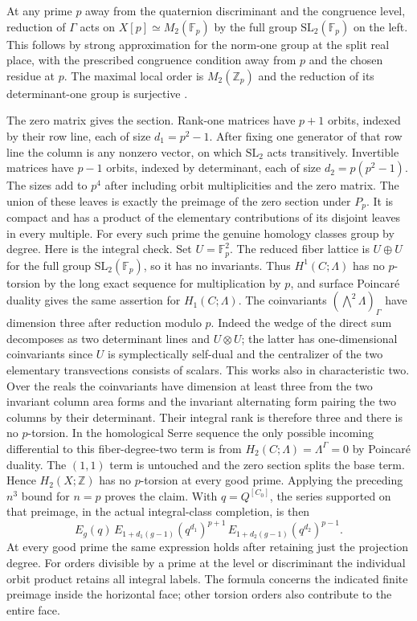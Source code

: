 At any prime \(p\) away from the quaternion discriminant and the congruence level, reduction of \(\Gamma\) acts on \(X[p]\simeq M_2(\mathbb F_p)\) by the full group \(\mathrm{SL}_2(\mathbb F_p)\) on the left. This follows by strong approximation for the norm-one group at the split real place, with the prescribed congruence condition away from \(p\) and the chosen residue at \(p\). The maximal local order is \(M_2(\mathbb Z_p)\) and the reduction of its determinant-one group is surjective \cite{voight}.

The zero matrix gives the section. Rank-one matrices have \(p+1\) orbits, indexed by their row line, each of size \(d_1=p^2-1\). After fixing one generator of that row line the column is any nonzero vector, on which \(\mathrm{SL}_2\) acts transitively. Invertible matrices have \(p-1\) orbits, indexed by determinant, each of size \(d_2=p(p^2-1)\). The sizes add to \(p^4\) after including orbit multiplicities and the zero matrix. The union of these leaves is exactly the preimage of the zero section under \(P_p\). It is compact and has a product of the elementary contributions of its disjoint leaves in every multiple. For every such prime the genuine homology classes group by degree. Here is the integral check. Set \(U=\mathbb F_p^2\). The reduced fiber lattice is \(U\oplus U\) for the full group \(\mathrm{SL}_2(\mathbb F_p)\), so it has no invariants. Thus \(H^1(C;\Lambda)\) has no \(p\)-torsion by the long exact sequence for multiplication by \(p\), and surface Poincaré duality gives the same assertion for \(H_1(C;\Lambda)\). The coinvariants \((\bigwedge^2\Lambda)_\Gamma\) have dimension three after reduction modulo \(p\). Indeed the wedge of the direct sum decomposes as two determinant lines and \(U\otimes U\); the latter has one-dimensional coinvariants since \(U\) is symplectically self-dual and the centralizer of the two elementary transvections consists of scalars. This works also in characteristic two. Over the reals the coinvariants have dimension at least three from the two invariant column area forms and the invariant alternating form pairing the two columns by their determinant. Their integral rank is therefore three and there is no \(p\)-torsion. In the homological Serre sequence the only possible incoming differential to this fiber-degree-two term is from \(H_2(C;\Lambda)=\Lambda^\Gamma=0\) by Poincaré duality. The \((1,1)\) term is untouched and the zero section splits the base term. Hence \(H_2(X;\mathbb Z)\) has no \(p\)-torsion at every good prime. Applying the preceding \(n^3\) bound for \(n=p\) proves the claim. With \(q=Q^{[C_0]}\), the series supported on that preimage, in the actual integral-class completion, is then
\[E_g(q)\,
     E_{1+d_1(g-1)}(q^{d_1})^{p+1}\,
     E_{1+d_2(g-1)}(q^{d_2})^{p-1}.\]
At every good prime the same expression holds after retaining just the projection degree. For orders divisible by a prime at the level or discriminant the individual orbit product retains all integral labels. The formula concerns the indicated finite preimage inside the horizontal face; other torsion orders also contribute to the entire face.

